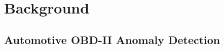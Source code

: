 \documentclass[12pt]{article}
\begin{document}
% 
% 
 
\section{Background}
\label{sec:Background}
\subsection{Automotive OBD-II Anomaly Detection}
\label{subsec:Obd2}
\end{document}
